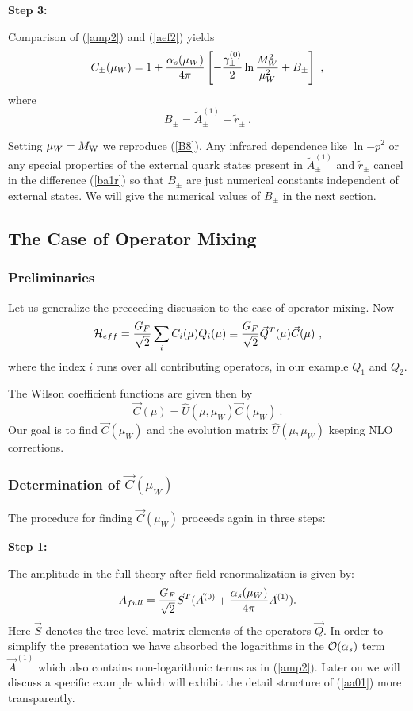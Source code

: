 \documentclass[12pt]{article}
\def\as{\alpha_s}
\newcommand{\mw}{M_{\rm W}}
\newcommand{\ord}{{\cal O}}
\begin{document}
\begin{itemize}
\begin{itemize}
\begin{itemize}
{\bf Step 3:}

Comparison of (\ref{amp2}) and (\ref{aef2}) yields 
\begin{equation}\label{cmw2}
 C_\pm(\mu_W)=1+{\as(\mu_W)\over 4\pi}\left[-{{\gamma^{(0)}_\pm}\over 2}
 \ln{M^2_W\over\mu^2_W}+B_\pm\right]~, \end{equation}
where
\begin{equation}\label{ba1r} B_\pm=\tilde A_\pm^{(1)}-\tilde r_\pm~.
 \end{equation}

Setting $\mu_W=\mw$ we reproduce (\ref{B8}).
Any infrared dependence like $\ln{-p^2}$ or any special properties
of the external quark states present in $\tilde A_\pm^{(1)}$ and 
$\tilde r_\pm$
cancel in the difference (\ref{ba1r}) so that $B_\pm$ are just  numerical 
constants independent of external states. We will give the numerical values of
$B_\pm$ in the next section.


\subsection{The Case of Operator Mixing}
\subsubsection{Preliminaries}
Let us generalize the preceeding discussion to the case of operator
mixing. Now
\begin{equation}\label{hqtc}
{\cal H}_{eff}={G_F\over\sqrt{2}}\sum_i C_i(\mu)Q_i(\mu)\equiv
  {G_F\over\sqrt{2}}\vec Q^T(\mu) \vec C(\mu)~,   \end{equation}
where the index $i$ runs over all contributing operators, in our
example $Q_1$ and $Q_2$. 

The Wilson coefficient functions are given then by
\begin{equation}\label{cucw}
\vec C(\mu)=\hat U(\mu, \mu_W)\vec C(\mu_W)~.
\end{equation}
Our goal is to find $\vec C(\mu_W)$ and the evolution matrix
$\hat U(\mu, \mu_W)$ keeping NLO corrections.   
\subsubsection{Determination of $\vec C(\mu_W)$}
The procedure for finding $\vec C(\mu_W)$ proceeds again in three
steps:

{\bf Step 1:}

The  amplitude in the full theory after
field renormalization is given by:
\begin{equation}\label{aa01} A_{full}=
{G_F\over\sqrt{2}}\vec S^T(\vec A^{(0)}
+{\as(\mu_W)\over 4\pi}\vec A^{(1)}).
\end{equation}
Here $\vec S$ denotes the tree level matrix elements of the
operators $\vec Q$. In order to simplify the presentation we
have absorbed the logarithms in the $\ord(\alpha_s)$ term
$\vec A^{(1)}$ which also contains non-logarithmic terms as in
(\ref{amp2}). Later on we will discuss a specific example which
will exhibit the detail structure of (\ref{aa01}) more transparently.


\end{itemize}
\end{itemize}
\end{itemize}
\end{document}
